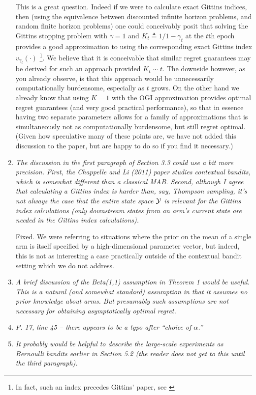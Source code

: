 \documentclass[11pt]{article}
\newcommand{\1}{\ensuremath{\mathbf{1}}} %
\theoremstyle{thm-sf}
\begin{document}
\begin{enumerate}
	
This is a great question. Indeed if we were to calculate exact Gittins indices, then (using the equivalence between discounted infinite horizon problems, and random finite horizon problems) one could conceivably posit that solving the Gittins stopping problem with $\gamma = 1$ and $K_t \triangleq 1/1 - \gamma_t$ at the $t$th epoch provides a good approximation to using the corresponding exact Gittins index $v_{\gamma_t}(\cdot)$ \footnote{In fact, such an index precedes Gittins' paper, see \cite{bradt1956sequential}}. We believe that it is conceivable that similar regret guarantees may be derived for such an approach provided $K_t \sim t$. The downside however, as you already observe, is that this approach would be unnecessarily computationally burdensome, especially as $t$ grows. On the other hand we already know that using $K=1$ with the OGI approximation provides optimal regret guarantees (and very good practical performance), so that in essence having two separate parameters allows for a family of approximations that is simultaneously not as computationally burdensome, but still regret optimal. (Given how speculative many of these points are, we have not added this discussion to the paper, but are happy to do so if you find it necessary.) 




		
	\item {\it The discussion in the first paragraph of Section 3.3 could use a bit more precision. First, the Chappelle and Li (2011) paper studies contextual bandits, which is somewhat different than a classical MAB. Second, although I agree that calculating a Gittins index is harder than, say, Thompson sampling, it’s not always the case that the entire state space $\cal{Y}$ is relevant for the Gittins index calculations (only downstream states from an arm’s current state are needed in the Gittins index calculations).}
	
	Fixed. We were referring to situations where the prior on the mean of a single arm is itself specified by a high-dimensional parameter vector, but indeed, this is not as interesting a case practically outside of the contextual bandit setting which we do not address. 
	
	\item {\it A brief discussion of the Beta(1,1) assumption in Theorem 1 would be useful. This is a natural (and somewhat standard) assumption in that it assumes no prior knowledge about arms. But presumably such assumptions are not necessary for obtaining asymptotically optimal regret.
	}
	
	\item {\it  P. 17, line 45 – there appears to be a typo after “choice of $\alpha$.”}
	
	\item {\it It probably would be helpful to describe the large-scale experiments as Bernoulli bandits earlier in Section 5.2 (the reader does not get to this until the third paragraph).}
	\end{enumerate}
	
\end{document}
